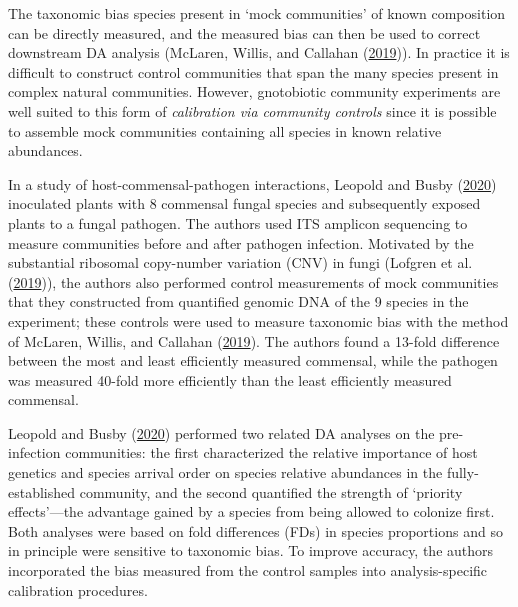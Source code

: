 \documentclass[
]{article}
\begin{document}
The taxonomic bias species present in `mock communities' of known composition can be directly measured, and the measured bias can then be used to correct downstream DA analysis (McLaren, Willis, and Callahan (\protect\hyperlink{ref-mclaren2019cons}{2019})).
In practice it is difficult to construct control communities that span the many species present in complex natural communities.
However, gnotobiotic community experiments are well suited to this form of \emph{calibration via community controls} since it is possible to assemble mock communities containing all species in known relative abundances.

In a study of host-commensal-pathogen interactions, Leopold and Busby (\protect\hyperlink{ref-leopold2020host}{2020}) inoculated plants with 8 commensal fungal species and subsequently exposed plants to a fungal pathogen.
The authors used ITS amplicon sequencing to measure communities before and after pathogen infection.
Motivated by the substantial ribosomal copy-number variation (CNV) in fungi (Lofgren et al. (\protect\hyperlink{ref-lofgren2019geno}{2019})), the authors also performed control measurements of mock communities that they constructed from quantified genomic DNA of the 9 species in the experiment; these controls were used to measure taxonomic bias with the method of McLaren, Willis, and Callahan (\protect\hyperlink{ref-mclaren2019cons}{2019}).
The authors found a 13-fold difference between the most and least efficiently measured commensal, while the pathogen was measured 40-fold more efficiently than the least efficiently measured commensal.

Leopold and Busby (\protect\hyperlink{ref-leopold2020host}{2020}) performed two related DA analyses on the pre-infection communities: the first characterized the relative importance of host genetics and species arrival order on species relative abundances in the fully-established community, and the second quantified the strength of `priority effects'---the advantage gained by a species from being allowed to colonize first.
Both analyses were based on fold differences (FDs) in species proportions and so in principle were sensitive to taxonomic bias.
To improve accuracy, the authors incorporated the bias measured from the control samples into analysis-specific calibration procedures.
\end{document}
